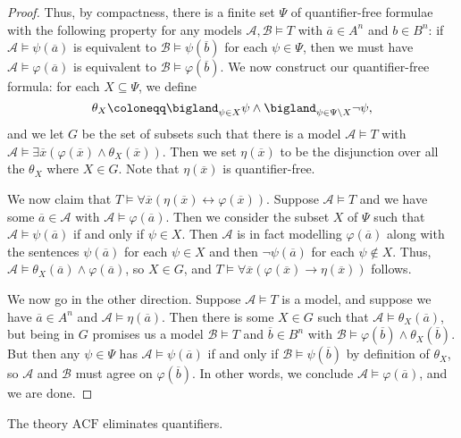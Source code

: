 \documentclass[../notes.tex]{subfiles}
\begin{document}
\begin{proof}
	Thus, by compactness, there is a finite set $\Psi$ of quantifier-free formulae with the following property for any models $\mathcal A,\mathcal B\models T$ with $\overline a\in A^n$ and $b\in B^n$: if $\mathcal A\models\psi(\overline a)$ is equivalent to $\mathcal B\models\psi(\overline b)$ for each $\psi\in\Psi$, then we must have $\mathcal A\models\varphi(\overline a)$ is equivalent to $\mathcal B\models\varphi(\overline b)$. We now construct our quantifier-free formula: for each $X\subseteq\Psi$, we define
	\[\theta_X\coloneqq\bigland_{\psi\in X}\psi\land\bigland_{\psi\in\Psi\setminus X}\lnot\psi,\]
	and we let $G$ be the set of subsets such that there is a model $\mathcal A\models T$ with $\mathcal A\models\exists\overline x(\varphi(\overline x)\land\theta_X(\overline x))$. Then we set $\eta(\overline x)$ to be the disjunction over all the $\theta_X$ where $X\in G$. Note that $\eta(\overline x)$ is quantifier-free.

	We now claim that $T\models\forall\overline x(\eta(\overline x)\leftrightarrow\varphi(\overline x))$. Suppose $\mathcal A\models T$ and we have some $\overline a\in\mathcal A$ with $\mathcal A\models\varphi(\overline a)$. Then we consider the subset $X$ of $\Psi$ such that $\mathcal A\models\psi(\overline a)$ if and only if $\psi\in X$. Then $\mathcal A$ is in fact modelling $\varphi(\overline a)$ along with the sentences $\psi(\overline a)$ for each $\psi\in X$ and then $\lnot\psi(\overline a)$ for each $\psi\notin X$. Thus, $\mathcal A\models\theta_X(\overline a)\land\varphi(\overline a)$, so $X\in G$, and $T\models\forall\overline x(\varphi(\overline x)\to\eta(\overline x))$ follows.

	We now go in the other direction. Suppose $\mathcal A\models T$ is a model, and suppose we have $\overline a\in A^n$ and $\mathcal A\models\eta(\overline a)$. Then there is some $X\in G$ such that $\mathcal A\models\theta_X(\overline a)$, but being in $G$ promises us a model $\mathcal B\models T$ and $\overline b\in B^n$ with $\mathcal B\models\varphi(\overline b)\land\theta_X(\overline b)$. But then any $\psi\in\Psi$ has $\mathcal A\models\psi(\overline a)$ if and only if $\mathcal B\models\psi(\overline b)$ by definition of $\theta_X$, so $\mathcal A$ and $\mathcal B$ must agree on $\varphi(\overline b)$. In other words, we conclude $\mathcal A\models\varphi(\overline a)$, and we are done.
\end{proof}
\begin{corollary}
	The theory $\mathrm{ACF}$ eliminates quantifiers.
\end{corollary}
\end{document}

